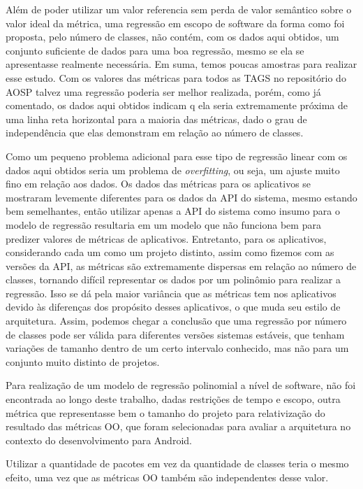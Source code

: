 Além de poder utilizar um valor referencia sem perda de valor semântico sobre o valor ideal da métrica, uma regressão em escopo de software da forma como foi proposta, pelo número de classes, não contém, com os dados aqui obtidos, um conjunto suficiente de dados para uma boa regressão, mesmo se ela se apresentasse realmente necessária. Em suma, temos poucas amostras para realizar esse estudo. Com os valores das métricas para todos as TAGS no repositório do AOSP talvez uma regressão poderia ser melhor realizada, porém, como já comentado, os dados aqui obtidos indicam q ela seria extremamente próxima de uma linha reta horizontal para a maioria das métricas, dado o grau de independência que elas demonstram em relação ao número de classes.

Como um pequeno problema adicional para esse tipo de regressão linear com os dados aqui obtidos seria um problema de \textit{overfitting}, ou seja, um ajuste muito fino em relação aos dados. Os dados das métricas para os aplicativos se mostraram levemente diferentes para os dados da API do sistema, mesmo estando bem semelhantes, então utilizar apenas a API do sistema como insumo para o modelo de regressão resultaria em um modelo que não funciona bem para predizer valores de métricas de aplicativos. Entretanto, para os aplicativos, considerando cada um como um projeto distinto, assim como fizemos com as versões da API, as métricas são extremamente dispersas em relação ao número de classes, tornando difícil representar os dados por um polinômio para realizar a regressão. Isso se dá pela maior variância que as métricas tem nos aplicativos devido às diferenças dos propósito desses aplicativos, o que muda seu estilo de arquitetura. Assim, podemos chegar a conclusão que uma regressão por número de classes pode ser válida para diferentes versões sistemas estáveis, que tenham variações de tamanho dentro de um certo intervalo conhecido, mas não para um conjunto muito distinto de projetos.

Para realização de um modelo de regressão polinomial a nível de software, não foi encontrada ao longo deste trabalho, dadas restrições de tempo e escopo, outra métrica que representasse bem o tamanho do projeto para relativização do resultado das métricas OO, que foram selecionadas para avaliar a arquitetura no contexto do desenvolvimento para Android. 

Utilizar a quantidade de pacotes em vez da quantidade de classes teria o mesmo efeito, uma vez que as métricas OO também são independentes desse valor.

